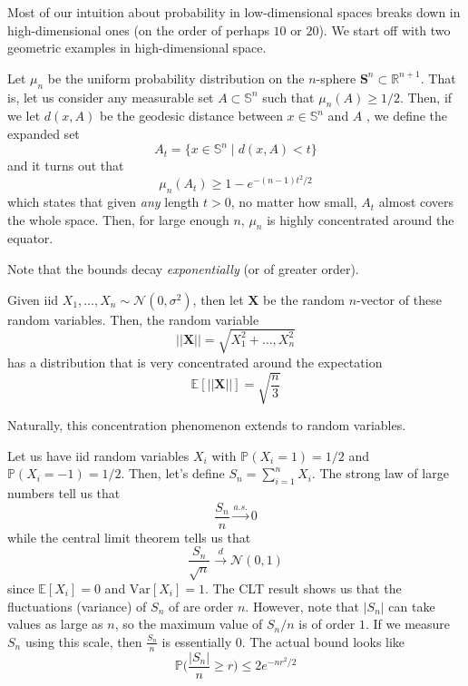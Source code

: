 \documentclass{article}
\begin{document}
  Most of our intuition about probability in low-dimensional spaces breaks down in high-dimensional ones (on the order of perhaps $10$ or $20$). We start off with two geometric examples in high-dimensional space. 

  \begin{example}
  Let $\mu_n$ be the uniform probability distribution on the $n$-sphere $\mathbf{S}^{n} \subset \mathbb{R}^{n+1}$. That is, let us consider any measurable set $A \subset \mathbb{S}^{n}$ such that $\mu_n (A) \geq 1/2$. Then, if we let $d(x, A)$ be the geodesic distance between $x \in \mathbb{S}^n$ and $A$ , we define the expanded set 
  \[A_t = \{x \in \mathbb{S}^n \mid d(x, A) < t\}\]
  and it turns out that 
  \[\mu_n (A_t) \geq 1 - e^{- (n -1) t^2 / 2}\]
  which states that given \textit{any} length $t > 0$, no matter how small, $A_t$ almost covers the whole space. Then, for large enough $n$, $\mu_n$ is highly concentrated around the equator. 
  \end{example}

  Note that the bounds decay \textit{exponentially} (or of greater order). 

  \begin{example}

  \end{example}

  \begin{example}
  Given iid $X_1, \ldots, X_n \sim \mathcal{N}(0, \sigma^2)$, then let $\mathbf{X}$ be the random $n$-vector of these random variables. Then, the random variable 
  \[||\mathbf{X}|| = \sqrt{X_1^2 + \ldots, X_n^2}\]
  has a distribution that is very concentrated around the expectation 
  \[\mathbb{E}[||\mathbf{X}||] = \sqrt{\frac{n}{3}}\]
  \end{example}

  Naturally, this concentration phenomenon extends to random variables. 

  \begin{example}
  Let us have iid random variables $X_i$ with $\mathbb{P}(X_i = 1) = 1/2$ and $\mathbb{P}(X_i = -1) = 1/2$. Then, let's define $S_n = \sum_{i=1}^n X_i$. The strong law of large numbers tell us that 
  \[\frac{S_n}{n} \xrightarrow{a.s.} 0\]
  while the central limit theorem tells us that 
  \[\frac{S_n}{\sqrt{n}} \xrightarrow{d} \mathcal{N}(0, 1)\]
  since $\mathbb{E}[X_i] = 0$ and $\mathrm{Var}[X_i] = 1$. The CLT result shows us that the fluctuations (variance) of $S_n$ of are order $n$. However, note that $|S_n|$ can take values as large as $n$, so the maximum value of $S_n / n$ is of order $1$. If we measure $S_n$ using this scale, then $\frac{S_n}{n}$ is essentially $0$. The actual bound looks like 
  \[\mathbb{P} \bigg( \frac{|S_n|}{n} \geq r \bigg) \leq 2 e^{-n r^2 / 2}\]
  \end{example}
\end{document}
